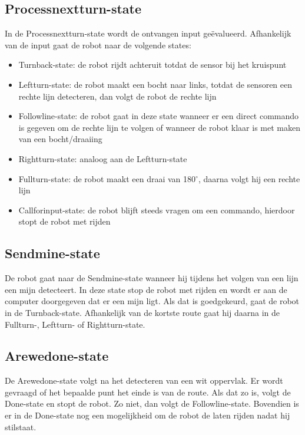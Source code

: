 \documentclass{report}
\begin{document}
\subsection{Processnextturn-state}
In de Processnextturn-state wordt de ontvangen input ge\"{e}valueerd.
Afhankelijk van de input gaat de robot naar de volgende states:
\begin{itemize}
\item Turnback-state: de robot rijdt achteruit totdat de sensor bij het kruispunt
\item Leftturn-state: de robot maakt een bocht naar links, totdat de sensoren een rechte lijn detecteren, dan volgt de robot de rechte lijn
\item Followline-state: de robot gaat in deze state wanneer er een direct commando is gegeven om de rechte lijn te volgen of wanneer de robot klaar is met maken van een bocht/draaiing
\item Rightturn-state: analoog aan de Leftturn-state
\item Fullturn-state: de robot maakt een draai van 180$^\circ$, daarna volgt hij een rechte lijn
\item Callforinput-state: de robot blijft steeds vragen om een commando, hierdoor stopt de robot met rijden
\end{itemize} 

\subsection{Sendmine-state}
De robot gaat naar de Sendmine-state wanneer hij tijdens het volgen van een lijn een mijn detecteert.
In deze state stop de robot met rijden en wordt er aan de computer doorgegeven dat er een mijn ligt.
Als dat is goedgekeurd, gaat de robot in de Turnback-state. Afhankelijk van de kortste route gaat hij daarna in de Fullturn-, Leftturn- of Rightturn-state. 

\subsection{Arewedone-state}
De Arewedone-state volgt na het detecteren van een wit oppervlak.
Er wordt gevraagd of het bepaalde punt het einde is van de route.
Als dat zo is, volgt de Done-state en stopt de robot.
Zo niet, dan volgt de Followline-state.
Bovendien is er in de Done-state nog een mogelijkheid om de robot de laten rijden nadat hij stilstaat.
\end{document}
